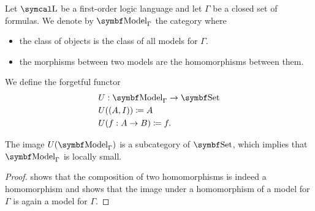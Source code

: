 \begin{definition}\label{def:first_order_model_category}
  Let \( \CL \) be a first-order logic language and let \( \Gamma \) be a closed set of formulas. We denote by \( \Cat{Model}_\Gamma \) the category where
  \begin{itemize}
    \item the class of objects is the class of all models for \( \Gamma \).
    \item the morphisms between two models are the homomorphisms between them.
  \end{itemize}

  We define the forgetful functor
  \begin{align*}
    &U: \Cat{Model}_\Gamma \to \Cat{Set} \\
    &U((A, I)) \coloneqq A \\
    &U(f: A \to B) \coloneqq f.
  \end{align*}

  The image \( U(\Cat{Model}_\Gamma) \) is a subcategory of \( \Cat{Set} \), which implies that \( \Cat{Model}_\Gamma \) is locally small.
\end{definition}
\begin{proof}
   shows that the composition of two homomorphisms is indeed a homomorphism and  shows that the image under a homomorphism of a model for \( \Gamma \) is again a model for \( \Gamma \).
\end{proof}

